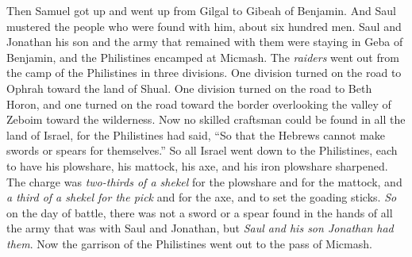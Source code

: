 \begin{biblechapter}
\verse Then Samuel got up and went up from Gilgal to Gibeah of Benjamin. And Saul mustered the people who were found with him, about six hundred men.
\verse Saul and Jonathan his son and the army that remained with them were staying in Geba of Benjamin, and the Philistines encamped at Micmash.
\verse The \textit{raiders} went out from the camp of the Philistines in three divisions. One division turned on the road to Ophrah toward the land of Shual.
\verse One division turned on the road to Beth Horon, and one turned on the road toward the border overlooking the valley of Zeboim toward the wilderness.
\verse Now no skilled craftsman could be found in all the land of Israel, for the Philistines had said, “So that the Hebrews cannot make swords or spears for themselves.”
\verse So all Israel went down to the Philistines, each to have his plowshare, his mattock, his axe, and his iron plowshare sharpened.
\verse The charge was \textit{two-thirds of a shekel} for the plowshare and for the mattock, and \textit{a third of a shekel for the pick} and for the axe, and to set the goading sticks.
\verse \textit{So} on the day of battle, there was not a sword or a spear found in the hands of all the army that was with Saul and Jonathan, but \textit{Saul and his son Jonathan had them}.
\verse Now the garrison of the Philistines went out to the pass of Micmash.
\end{biblechapter}

